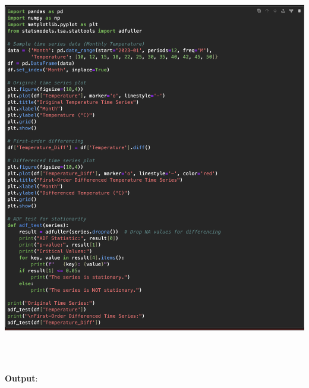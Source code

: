 \documentclass{article}
\begin{document}
\begin{itemize}
\begin{itemize}
\includegraphics[width=14cm,height=18cm]{I.png}
\newpage
\textbf{Output}:


\end{itemize}
\end{itemize}
\end{document}
